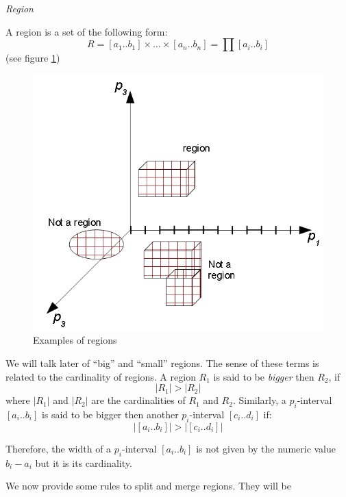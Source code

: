 \begin{defn}
\emph{Region}

A region is a set of the following form:
\[
R=\left[a_{1}..b_{1}\right]\times\dots\times\left[a_{n}..b_{n}\right]=\prod\left[a_{i}..b_{i}\right]
\]
 (see figure \ref{pers02.fig:Examples-of-regions})

\begin{figure}[h]
\includegraphics[width=0.9\columnwidth]{img/regions}

\caption{\label{pers02.fig:Examples-of-regions}Examples of regions}


\end{figure}
\end{defn}
\begin{rem}
We will talk later of ``big'' and ``small'' regions. The sense
of these terms is related to the cardinality of regions. A region
$R_{1}$ is said to be \emph{bigger }then $R_{2}$, if
\[
\left|R_{1}\right|>\left|R_{2}\right|
\]
 where $\left|R_{1}\right|$ and $\left|R_{2}\right|$ are the cardinalities
of $R_{1}$ and $R_{2}$. Similarly, a $p_{i}$-interval $\left[a_{i}..b_{i}\right]$
is said to be bigger then another $p_{i}$-interval $\left[c_{i}..d_{i}\right]$
if:
\[
\left|\left[a_{i}..b_{i}\right]\right|>\left|\left[c_{i}..d_{i}\right]\right|
\]


Therefore, the width of a $p_{i}$-interval $\left[a_{i}..b_{i}\right]$
is not given by the numeric value $b_{i}-a_{i}$ but it is its cardinality.
\end{rem}
We now provide some rules to split and merge regions. They will be
